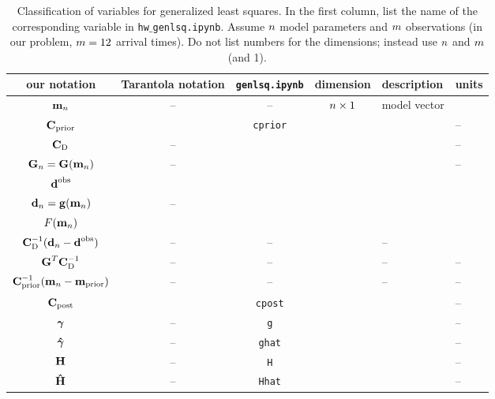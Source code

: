 \begin{table}[h]
\caption[]{{
Classification of variables for generalized least squares. In the first column, list the name of the corresponding variable in {\tt hw$\_$genlsq.ipynb}. Assume $n$ model parameters and $m$ observations (in our problem, $m=12$ arrival times). Do not list numbers for the dimensions; instead use $n$ and $m$ (and 1).
\label{tab:vars}
}}
\begin{spacing}{1.4}
\hspace{-1cm}
\begin{tabular}{c|c|c|c|l|l}
\hline
our notation & Tarantola notation & {\tt genlsq.ipynb} & dimension & description \hspace{2cm} & units \hspace{0.5cm} \\
\hline\hline 
$\mbox{${\bf m}$}_n$
& --
& --
& $n \times 1$ 
& model vector
&
\\ \hline
$\mbox{${\bf C}$}_{\rm prior}$
& 
& \verb+cprior+
&
&
& --
\\ \hline
$\mbox{${\bf C}$}_{\rm D}$
& --
&
&
&
& --
\\ \hline
$\mbox{${\bf G}$}_n = \mbox{${\bf G}$}(\mbox{${\bf m}$}_n)$
& --
& 
&
&
& --
\\ \hline
$\mbox{${\bf d}$}^{\rm obs}$
&
&
&
& 
\\ \hline
$\mbox{${\bf d}$}_n = \mbox{${\bf g}$}(\mbox{${\bf m}$}_n)$
& --
&
&
& 
\\ \hline
\hline
$F(\mbox{${\bf m}$}_n)$
&
&
&
&
\\ \hline
$\mbox{${\bf C}$}_{\rm D}^{-1} (\mbox{${\bf d}$}_n - \mbox{${\bf d}$}^{\rm obs})$
& --
& --
&
& --
\\ \hline
$\mbox{${\bf G}$}^T\mbox{${\bf C}$}_{\rm D}^{-1}$
& --
& --
&
& --
& --
\\ \hline
$\mbox{${\bf C}$}_{\rm prior}^{-1} (\mbox{${\bf m}$}_n - \mbox{${\bf m}$}_{\rm prior})$
& --
& --
&
& --
& --
\\ \hline
\hline
$\mbox{${\bf C}$}_{\rm post}$
& 
& \verb+cpost+
&
& 
& --
\\ \hline
$\mbox{\boldmath $\bf \gamma$}$
& --
& \verb+g+
&
&
& --
\\ \hline
$\mbox{\boldmath{$\hat{\gamma}$}}$
& --
& \verb+ghat+
&
&
& --
\\ \hline
$\mbox{${\bf H}$}$
& --
& \verb+H+
&
&
& --
\\ \hline
$\mbox{\boldmath{$\hat{\rm H}$}}$
& --
& \verb+Hhat+
&
&
& --
\\ \hline
\hline
\end{tabular}
\end{spacing}
\end{table}
